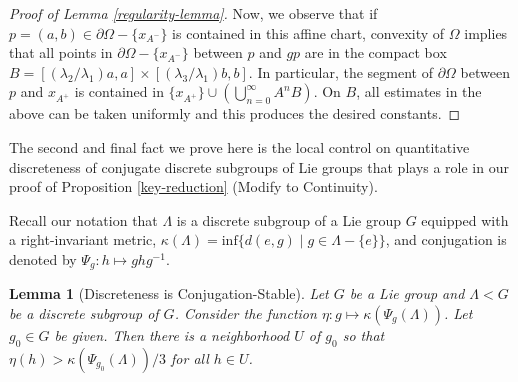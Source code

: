 \documentclass[12pt,a4paper]{amsart}
\theoremstyle{definition}
\theoremstyle{plain}
\newtheorem{lemma}[theorem]{Lemma}
\numberwithin{equation}{section}
\begin{document}
\begin{proof}[Proof of Lemma \ref{regularity-lemma}]
    Now, we observe that if $p = (a,b) \in \partial \Omega - \{x_{A^-}\}$ is contained in this affine chart, convexity of $\Omega$ implies that all points in $\partial \Omega - \{ x_{A^{-}} \}$ between $p$ and $gp$ are in the compact box $B = [(\lambda_2/\lambda_1 )a, a] \times [(\lambda_3/\lambda_1 )b, b]$. In particular, the segment of $\partial \Omega$ between $p$ and $x_{A^+}$ is contained in $\{x_{A^+}\} \cup (  \bigcup_{n=0}^\infty A^n B)$. On $B$, all estimates in the above can be taken uniformly and this produces the desired constants. 
\end{proof}

The second and final fact we prove here is the local control on quantitative discreteness of conjugate discrete subgroups of Lie groups that plays a role in our proof of Proposition \ref{key-reduction} (Modify to Continuity).

Recall our notation that $\Lambda$ is a discrete subgroup of a Lie group $G$ equipped with a right-invariant metric, $\kappa(\Lambda) = \text{inf} \{ d(e,g) \mid g \in \Lambda - \{e\} \}$, and conjugation is denoted by $\Psi_g: h \mapsto gh g^{-1}$.

    \begin{lemma}[Discreteness is Conjugation-Stable]\label{appendix-lemma-discreteness-conjugation-stable}
    Let $G$ be a Lie group and $\Lambda < G$ be a discrete subgroup of $G$. Consider the function $\eta: g \mapsto \kappa(\Psi_g(\Lambda))$. Let $g_0 \in G$ be given. Then there is a neighborhood $U$ of $g_0$ so that $\eta(h) > \kappa(\Psi_{g_0}(\Lambda))/3$ for all $h \in U$.
\end{lemma}
\end{document}
